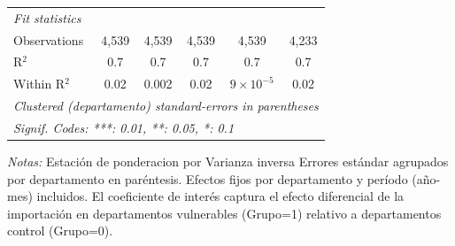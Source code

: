 \documentclass[12pt]{article}
\begin{document}
\begin{table}[htbp]
\begin{threeparttable}
\begin{tabular}{lccccc}
      \midrule
      \emph{Fit statistics}\\
      Observations                                      & 4,539                & 4,539                & 4,539               & 4,539              & 4,233\\  
      R$^2$                                             & 0.7                  & 0.7                  & 0.7                 & 0.7                & 0.7\\  
      Within R$^2$                                      & 0.02                 & 0.002                & 0.02                & $9\times 10^{-5}$  & 0.02\\  
      \midrule \midrule
      \multicolumn{6}{l}{\emph{Clustered (departamento) standard-errors in parentheses}}\\
      \multicolumn{6}{l}{\emph{Signif. Codes: ***: 0.01, **: 0.05, *: 0.1}}\\
   \end{tabular}


\begin{tablenotes}
\footnotesize
\item \textit{Notas:} Estación de ponderacion por Varianza inversa
Errores estándar agrupados por departamento en paréntesis.
Efectos fijos por departamento y período (año-mes) incluidos.
El coeficiente de interés captura el efecto diferencial de la importación
en departamentos vulnerables (Grupo=1) relativo a departamentos control (Grupo=0).
\end{tablenotes}
\end{threeparttable}
\end{table}
\end{document}
